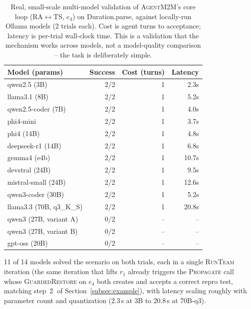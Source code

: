 \documentclass[10pt, anonymous, conference]{IEEEtran}
\theoremstyle{definition}
\theoremstyle{plain}
\theoremstyle{remark}
\newcommand{\tool}{\textsc{AgentM2M}}
\newcommand{\step}[1]{\textcircled{\scriptsize #1}}
\begin{document}
\begin{table}[t]
\centering
\caption{Real, small-scale multi-model validation of \tool{}'s core loop (RA$\leftrightarrow$TS, $e_4$) on
Duration.parse, against locally-run Ollama models (2 trials each). Cost is agent turns to acceptance;
latency is per-trial wall-clock time. This is a validation that the mechanism works across models, not a
model-quality comparison -- the task is deliberately simple.}
\label{tab:localmodels}
\footnotesize
\begin{tabular}{@{}l r r r@{}}
\toprule
Model (params) & Success & Cost (turns) & Latency \\
\midrule
qwen2.5 (3B)             & 2/2 & 1 & 2.3s \\
llama3.1 (8B)            & 2/2 & 1 & 5.2s \\
qwen2.5-coder (7B)       & 2/2 & 1 & 4.0s \\
phi4-mini                & 2/2 & 1 & 3.7s \\
phi4 (14B)               & 2/2 & 1 & 4.8s \\
deepseek-r1 (14B)        & 2/2 & 1 & 6.8s \\
gemma4 (e4b)             & 2/2 & 1 & 10.7s \\
devstral (24B)           & 2/2 & 1 & 9.5s \\
mistral-small (24B)      & 2/2 & 1 & 12.6s \\
qwen3-coder (30B)        & 2/2 & 1 & 5.2s \\
llama3.3 (70B, q3\_K\_S) & 2/2 & 1 & 20.8s \\
\midrule
qwen3 (27B, variant A)   & 0/2 & -- & -- \\
qwen3 (27B, variant B)   & 0/2 & -- & -- \\
gpt-oss (20B)            & 0/2 & -- & -- \\
\bottomrule
\end{tabular}
\end{table}

11 of 14 models solved the scenario on both trials, each in a single \textsc{RunTeam} iteration (the same
iteration that lifts $r_1$ already triggers the \textsc{Propagate} call whose \textsc{GuardedRestore} on
$e_4$ both creates and accepts a correct repro test, matching step~\step{2} of
Section~\ref{subsec:example}), with latency scaling roughly with parameter count and quantization (2.3\,s
at 3B to 20.8\,s at 70B-q3).
\end{document}
